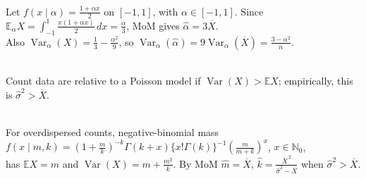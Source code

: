 \begin{example} \label{ex:angular-distribution-method-of-moments} \\
Let $f(x\mid\alpha)=\frac{1+\alpha x}{2}$ on $[-1,1]$, with $\alpha\in[-1,1]$. Since $\mathbb{E}_\alpha X=\int_{-1}^{1}\frac{x(1+\alpha x)}{2}\,dx=\frac{\alpha}{3}$, MoM gives $\widehat{\alpha}=3\overline{X}$.\\
Also $\operatorname{Var}_\alpha(X)=\frac{1}{3}-\frac{\alpha^2}{9}$, so $\operatorname{Var}_\alpha(\widehat{\alpha})=9\operatorname{Var}_\alpha(\overline{X})=\frac{3-\alpha^2}{n}$.
\end{example}

\begin{definition} \label{def:overdispersed-counts} \\
Count data are  relative to a Poisson model if $\operatorname{Var}(X)>\mathbb{E}X$; empirically, this is $\widehat{\sigma}^2>\overline{X}$.
\end{definition}

\begin{example} \label{ex:negative-binomial-overdispersion-estimation} \\
For overdispersed counts, negative-binomial mass $f(x\mid m,k)=(1+\frac{m}{k})^{-k}\Gamma(k+x)\{x!\Gamma(k)\}^{-1}(\frac{m}{m+k})^x$, $x\in\mathbb{N}_0$,\\
has $\mathbb{E}X=m$ and $\operatorname{Var}(X)=m+\frac{m^2}{k}$. By MoM $\widehat{m}=\overline{X}$, $\widehat{k}=\frac{\overline{X}^{\,2}}{\widehat{\sigma}^2-\overline{X}}$ when $\widehat{\sigma}^2>\overline{X}$.
\end{example}
